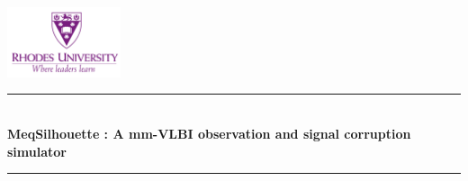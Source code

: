 \begin{titlepage}

\newcommand{\HRule}{\rule{\linewidth}{0.5mm}} %

\center %
 

\includegraphics[width=0.25\textwidth]{Images/Rhode.png}\\[1cm] %



\HRule \\[0.4cm]
{ \huge \bfseries MeqSilhouette : A mm-VLBI observation and signal corruption simulator}\\[0.4cm]
\HRule \\[1.5cm]



\end{titlepage}
